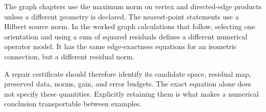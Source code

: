 The graph chapters use the maximum norm on vertex and directed-edge products unless a different geometry is declared. The nearest-point statements use a Hilbert source norm. In the worked graph calculations that follow, selecting one orientation and using a sum of squared residuals defines a different numerical operator model. It has the same edge-exactness equations for an isometric connection, but a different residual norm.

A repair certificate should therefore identify its candidate space, residual map, preserved data, norms, gain, and error budgets. The exact equation alone does not specify these quantities. Explicitly retaining them is what makes a numerical conclusion transportable between examples.
